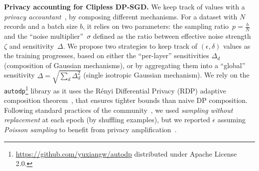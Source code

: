 \textbf{Privacy accounting for Clipless DP-SGD.} We keep track of \DP values with a \textit{privacy accountant}~\citep{abadi2016deep}, by composing different mechanisms. For a dataset with $N$ records and a batch size $b$, it relies on two parameters: the sampling ratio~${p=\frac{b}{N}}$ and the ``noise multiplier''~$\sigma$ defined as the ratio between effective noise strength~$\zeta$ and sensitivity~$\Delta$. We propose two strategies to keep track of $(\epsilon,\delta)$ values as the training progresses, based on either the ``per-layer'' sensitivities $\Delta_d$ (composition of Gaussian mechanisms), or by aggregating them into a ``global'' sensitivity $\Delta=\sqrt{\sum_d\Delta_d^2}$ (single isotropic Gaussian mechanism). We rely on the \lstinline[basicstyle=\ttfamily, backgroundcolor=\color{gray!20}]{autodp}\footnote{\url{https://github.com/yuxiangw/autodp} distributed under Apache License 2.0.} library as it uses the R\'enyi Differential Privacy (RDP) adaptive composition theorem~\citep{mironov2017renyi}, that ensures tighter bounds than naive DP composition. Following standard practices of the community~\citep{ponomareva2023dp}, we used \textit{sampling without replacement} at each epoch (by shuffling examples), but we reported $\epsilon$ assuming \textit{Poisson sampling} to benefit from privacy amplification~\citep{balle2018privacy}.  


